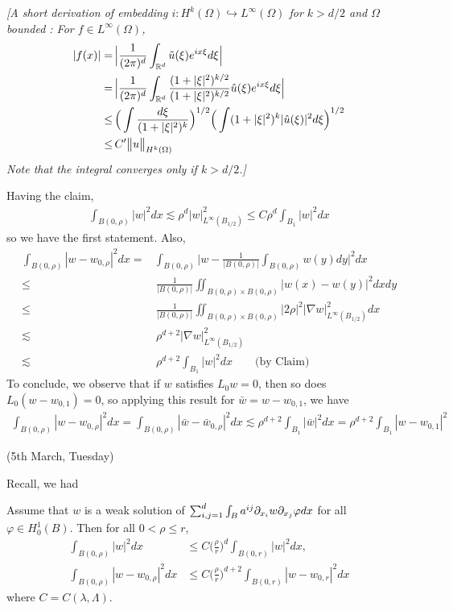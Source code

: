 \documentclass[12pt,a4paper]{article}
\newenvironment{proof}
{\begin{changemargin}{0.5cm}{0.5cm} 
	}%
	{\end{changemargin}
}
\newenvironment{subproof}
{\begin{changemargin}{0.5cm}{0.5cm} 
	}%
	{\end{changemargin}
}
\newenvironment{p}
{\begin{proof} 
	}%
	{\end{proof}
}
\begin{document}
\begin{p}
\begin{subproof}
\emph{[A short derivation of embedding $i : H^k(\Omega) \hookrightarrow L^{\infty}(\Omega)$ for $k>d/2$ and $\Omega$ bounded : For $f\in L^{\infty}(\Omega)$,
\begin{align*}
|f(x)| =&\, \Big| \frac{1}{(2\pi)^d} \int_{\mathbb{R}^d} \tilde{u}(\xi) e^{ix\xi} d\xi\Big| \\
=&\, \Big| \frac{1}{(2\pi)^d}\int_{\mathbb{R}^d} \frac{(1+|\xi|^2)^{k/2}}{(1+|\xi|^2)^{k/2}}\hat{u}(\xi)e^{ix\xi} d\xi \Big| \\
\leq &\, \Big( \int \frac{d\xi}{(1+|\xi|^2)^{k}}\Big)^{1/2}\Big( \int (1+|\xi|^2)^{k}|\hat{u}(\xi)|^2 d\xi\Big)^{1/2} \\
\leq &\, C' \bigl\lVert u\bigr\rVert_{H^k(\Omega)} 
\end{align*}
Note that the integral converges only if $k>d/2$.]}
\end{subproof}
Having the claim,
\begin{align*}
\int_{B(0, \rho)} |w|^2 dx \lesssim \rho^d |w|^2_{L^{\infty}(B_{1/2})} \leq C \rho^d \int_{B_1} |w|^2 dx
\end{align*}
so we have the first statement. Also,
\begin{align*}
\int_{B(0, \rho)}|w - w_{0, \rho}|^2 dx =& \int_{B(0, \rho)}\Big|w - \frac{1}{|B(0, \rho)|} \int_{B(0, \rho)} w(y) dy \Big|^2 dx \\
\leq & \, \frac{1}{|B(0, \rho)|} \iint_{B(0, \rho) \times B(0, \rho)} |w(x) - w(y)|^2 dxdy \\
\leq & \, \frac{1}{|B(0, \rho)|} \iint_{B(0, \rho) \times B(0, \rho)} |2 \rho|^2 |\nabla w|_{L^{\infty}(B_{1/2})}^2 dx \\
\lesssim & \,\rho^{d+2} |\nabla w|_{L^{\infty}(B_{1/2})}^2 \\
\lesssim & \, \rho^{d+2} \int_{B_1} |w|^2 dx \quad \quad \text{(by Claim)}
\end{align*}
To conclude, we observe that if $w$ satisfies $L_0 w=0$, then so does $L_0 (w - w_{0,1})=0$, so applying this result for $\bar{w} = w-w_{0,1}$, we have
\begin{align*}
\int_{B(0, \rho)}|w - w_{0, \rho}|^2 dx = \int_{B(0, \rho)}|\bar{w} - \bar{w}_{0, \rho}|^2 dx \lesssim \rho^{d+2} \int_{B_1} |\bar w|^2 dx = \rho^{d+2} \int_{B_1} |w-w_{0,1}|^2
\end{align*}
\eop
\end{p}
\s

\newday

(5th March, Tuesday)
\s

Recall, we had
\s

\prop Assume that $w$ is a weak solution of $\sum_{i,j=1}^d \int_B a^{ij} \partial_{x_i} w \partial_{x_j} \varphi dx$ for all $\varphi \in H_0^1(B)$. Then for all  $0< \rho \leq r$, 
\begin{align*}
\int_{B(0, \rho)} |w|^2 dx &\leq C\big( \frac{\rho}{r} \big)^d \int_{B(0, r)} |w|^2 dx,\\
\int_{B(0, \rho)} |w - w_{0, \rho}|^2 dx &\leq C \big(\frac{\rho}{r} \big)^{d+2} \int_{B(0,r)} |w- w_{0,r}|^2 dx
\end{align*}
where $C= C(\lambda, \Lambda)$.
\s
\end{document}

